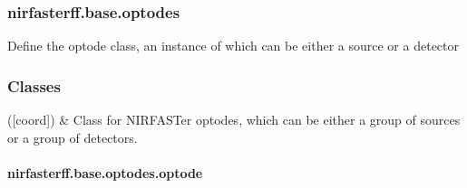 \documentclass[letterpaper,10pt,english]{sphinxmanual}
\begin{document}
\begin{fulllineitems}
\begin{fulllineitems}
\begin{quote}
\begin{description}
\end{description}\end{quote}

\end{fulllineitems}


\end{fulllineitems}


\sphinxstepscope


\subsubsection{nirfasterff.base.optodes}
\label{\detokenize{_autosummary/nirfasterff.base.optodes:module-nirfasterff.base.optodes}}\label{\detokenize{_autosummary/nirfasterff.base.optodes:nirfasterff-base-optodes}}\label{\detokenize{_autosummary/nirfasterff.base.optodes::doc}}
\sphinxAtStartPar
Define the optode class, an instance of which can be either a source or a detector
\subsubsection*{Classes}


\begin{savenotes}\sphinxattablestart
\sphinxthistablewithglobalstyle
\sphinxthistablewithnovlinesstyle
\centering
\begin{tabulary}{\linewidth}[t]{}
\sphinxtoprule
\sphinxtableatstartofbodyhook
\sphinxAtStartPar
{\hyperref[\detokenize{_autosummary/nirfasterff.base.optodes.optode:nirfasterff.base.optodes.optode}]{}}({[}coord{]})
&
\sphinxAtStartPar
Class for NIRFASTer optodes, which can be either a group of sources or a group of detectors.
\\
\sphinxbottomrule
\end{tabulary}
\sphinxtableafterendhook\par
\sphinxattableend\end{savenotes}

\sphinxstepscope


\paragraph{nirfasterff.base.optodes.optode}
\label{\detokenize{_autosummary/nirfasterff.base.optodes.optode:nirfasterff-base-optodes-optode}}\label{\detokenize{_autosummary/nirfasterff.base.optodes.optode::doc}}
\end{document}
